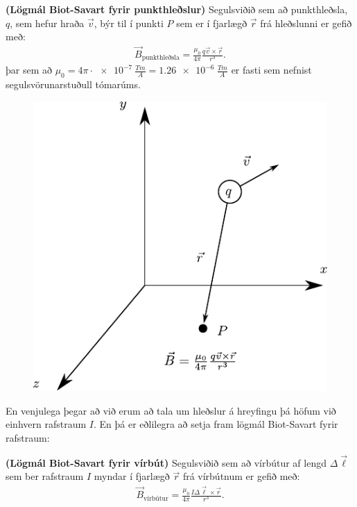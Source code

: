 \begin{tcolorbox}
\begin{theorem}
\textbf{(Lögmál Biot-Savart fyrir punkthleðslur)} Segulsviðið sem að punkthleðsla, $q$, sem hefur hraða $\Vec{v}$, býr til í punkti $P$ sem er í fjarlægð $\Vec{r}$ frá hleðslunni er gefið með:
\begin{align*}
    \Vec{B}_{\text{punkthleðsla}} = \frac{\mu_0}{4\pi} \frac{q\Vec{v} \times \Vec{r}}{r^3}.
\end{align*}
þar sem að $\mu_0 = 4\pi  \cdot \SI{e-7}{\frac{Tm}{A}} = \SI{1.26e-6}{\frac{Tm}{A}}$ er fasti sem nefnist segulsvörunarstuðull tómarúms.
\end{theorem}
\end{tcolorbox}
\begin{figure}[H]
    \centering
    \includegraphics[scale = 1]{figures/segulsvidid.pdf}
\end{figure}
En venjulega þegar að við erum að tala um hleðslur á hreyfingu þá höfum við einhvern rafstraum $I$. En þá er eðlilegra að setja fram lögmál Biot-Savart fyrir rafstraum:
\begin{tcolorbox}
\begin{theorem}
\textbf{(Lögmál Biot-Savart fyrir vírbút)} Segulsviðið sem að vírbútur af lengd $\Delta \vec{\ell}$ sem ber rafstraum $I$ myndar í fjarlægð $\vec{r}$ frá vírbútnum er gefið með:
\begin{align*}
    \Vec{B}_{\text{vírbútur}} = \frac{\mu_0}{4\pi} \frac{I\Delta \Vec{\ell} \times \Vec{r}}{r^3}.
\end{align*}
\end{theorem}
\end{tcolorbox}

